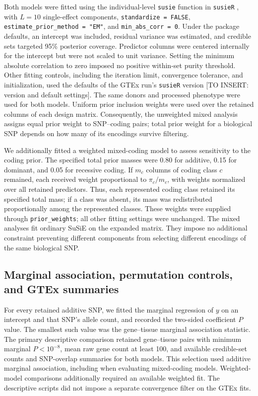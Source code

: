 \documentclass[12pt]{article}
\begin{document}
Both models were fitted using the individual-level \texttt{susie} function
in \texttt{susieR} \cite{wang_simple_2020}, with $L=10$ single-effect
components, \texttt{standardize = FALSE},
\texttt{estimate\_prior\_method = "EM"}, and
\texttt{min\_abs\_corr = 0}. Under the package defaults, an intercept was
included, residual variance was estimated, and credible sets targeted
95\% posterior coverage. Predictor columns were centered internally for
the intercept but were not scaled to unit variance. Setting the minimum
absolute correlation to zero imposed no positive within-set purity
threshold. Other fitting controls, including the iteration limit,
convergence tolerance, and initialization, used the defaults of the GTEx
run's \texttt{susieR} version [TO INSERT: version and default settings].
The same donors and processed phenotype were used for both models.
Uniform prior inclusion weights were used over the retained columns of
each design matrix. Consequently, the unweighted mixed analysis assigns
equal prior weight to SNP--coding pairs; total prior weight for a
biological SNP depends on how many of its encodings survive filtering.

We additionally fitted a weighted mixed-coding model to assess sensitivity
to the coding prior. The specified total prior masses were 0.80 for
additive, 0.15 for dominant, and 0.05 for recessive coding. If $m_c$ columns
of coding class $c$ remained, each received weight proportional to
$\pi_c/m_c$, with weights normalized over all retained predictors.
Thus, each represented coding class retained its specified total mass;
if a class was absent, its mass was redistributed proportionally among
the represented classes. These weights were supplied through
\texttt{prior\_weights}; all other fitting settings were unchanged.
The mixed analyses fit ordinary SuSiE on the expanded matrix. They impose
no additional constraint preventing different components from selecting
different encodings of the same biological SNP.

\subsection{Marginal association, permutation controls, and GTEx summaries}
For every retained additive SNP, we fitted the marginal regression of
$y$ on an intercept and that SNP's allele count, and recorded the
two-sided coefficient $P$ value. The smallest such value was the
gene--tissue marginal association statistic. The primary descriptive
comparison retained gene--tissue pairs with minimum marginal $P<10^{-8}$,
mean raw gene count at least 100, and available credible-set counts and
SNP-overlap summaries for both models. This selection used additive
marginal association, including when evaluating mixed-coding models.
Weighted-model comparisons additionally required an available weighted
fit. The descriptive scripts did not impose a separate convergence
filter on the GTEx fits.
\end{document}
